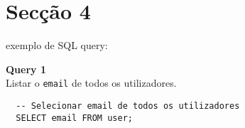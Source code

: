 ﻿\section{Secção 4} \label{section: seccao 4}

exemplo de SQL query:

  \textbf{Query 1}\\ 
    Listar o \texttt{email} de todos os utilizadores.
    \vspace{10pt}
    \begin{lstlisting}
  -- Selecionar email de todos os utilizadores
  SELECT email FROM user;
      \end{lstlisting}
